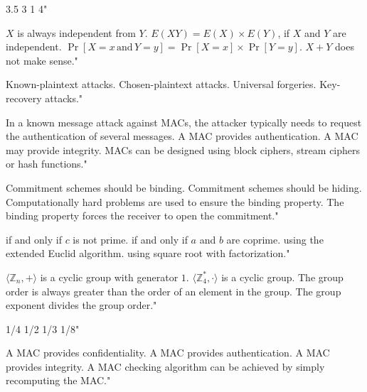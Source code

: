 {3.5}
{3}
{1}
{4"}

{$X$ is always independent from $Y$.}
{$E(XY)=E(X)\times E(Y)$, if $X$ and $Y$ are independent.}
{$\Pr[X = x \, \text{and} \, Y = y ] = \Pr[X = x ] \times \Pr[Y = y]$.}
{$X+Y$ does not make sense."}

{Known-plaintext attacks.}
{Chosen-plaintext attacks.}
{Universal forgeries.}
{Key-recovery attacks."}

{In a known message attack against MACs, the attacker typically needs to request the authentication of several messages.}
{A MAC provides authentication.}
{A MAC may provide integrity.}
{MACs can be designed using block ciphers, stream ciphers or hash functions."}

{Commitment schemes should be binding.}
{Commitment schemes should be hiding.}
{Computationally hard problems are used to ensure the binding property.}
{The binding property forces the receiver to open the commitment."}

{if and only if $c$ is not prime.}
{if and only if $a$ and $b$ are coprime.}
{using the extended Euclid algorithm.}
{using square root with factorization."}

{$\langle \mathbb{Z}_n, + \rangle$ is a cyclic group with generator $1$.}
{$\langle \mathbb{Z}^{*}_4, \cdot \rangle$ is a cyclic group.}
{The group order is always greater than the order of an element in the group.}
{The group exponent divides the group order."}

{1/4}
{1/2}
{1/3}
{1/8"}

{A MAC provides confidentiality.}
{A MAC provides authentication.}
{A MAC provides integrity.}
{A MAC checking algorithm can be achieved by simply recomputing the MAC."}

